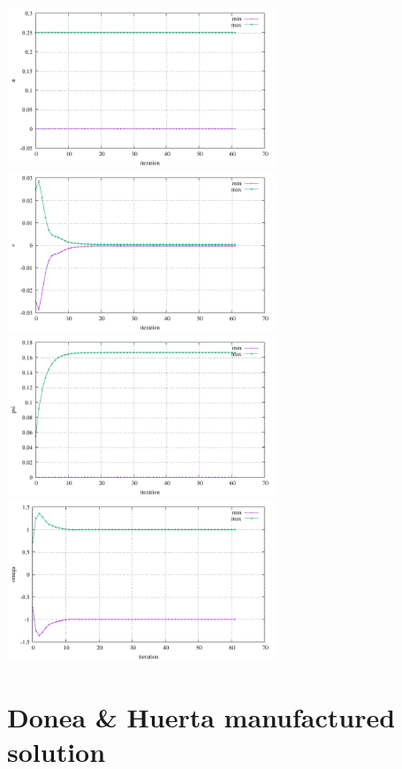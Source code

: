 \begin{center}
\includegraphics[width=8cm]{python_codes/fieldstone_154/results/stats_u}
\includegraphics[width=8cm]{python_codes/fieldstone_154/results/stats_v}\\
\includegraphics[width=8cm]{python_codes/fieldstone_154/results/stats_psi}
\includegraphics[width=8cm]{python_codes/fieldstone_154/results/stats_omega}
\end{center}



\section*{Donea \& Huerta manufactured solution}

